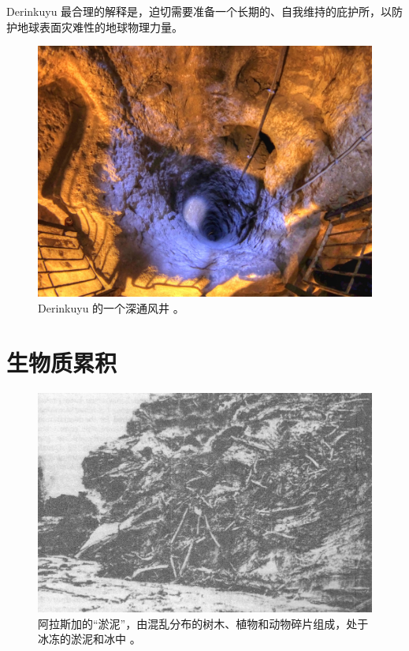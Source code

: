 \documentclass[10pt,twocolumn,letterpaper]{article}
\begin{document}
Derinkuyu 最合理的解释是，迫切需要准备一个长期的、自我维持的庇护所，以防护地球表面灾难性的地球物理力量。

\begin{figure}[t]
\begin{center}
   \includegraphics[width=1\linewidth]{derinkuyu-air.jpg}
\end{center}
   \caption{Derinkuyu 的一个深通风井 \cite{53}。}
\label{fig:6}
\label{fig:onecol}
\end{figure}

\section{生物质累积}

\begin{figure}[b]
\begin{center}
   \includegraphics[width=1\linewidth]{muck-crop.jpeg}
\end{center}
   \caption{阿拉斯加的“淤泥”，由混乱分布的树木、植物和动物碎片组成，处于冰冻的淤泥和冰中 \cite{146}。}
\label{fig:7}
\label{fig:onecol}
\end{figure}
\end{document}

